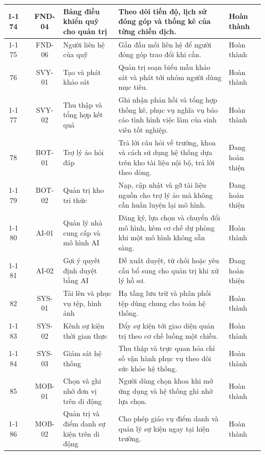 \documentclass[12pt,a4paper,oneside]{report}
\begin{document}
\begin{landscape}
\begin{longtable}{|c|>{\raggedright\arraybackslash}p{3.1cm}|c|>{\raggedright\arraybackslash}p{4.6cm}|>{\raggedright\arraybackslash}p{8.4cm}|>{\raggedright\arraybackslash}p{2.4cm}|}
\cline{1-1}\cline{3-6}
74 &  & FND-04 & Bảng điều khiển quỹ cho quản trị & Theo dõi tiến độ, lịch sử đóng góp và thống kê của từng chiến dịch. & Hoàn thành \\
\cline{1-1}\cline{3-6}
75 & \multirow{-5}{2.4cm}{\textbf{Gây quỹ}} & FND-06 & Người liên hệ của quỹ & Gắn đầu mối liên hệ để người đóng góp trao đổi khi cần. & Hoàn thành \\
\hline
76 &  & SVY-01 & Tạo và phát khảo sát & Quản trị soạn biểu mẫu khảo sát và phát tới nhóm người dùng mục tiêu. & Hoàn thành \\
\cline{1-1}\cline{3-6}
77 & \multirow{-2}{2.4cm}{\textbf{Khảo sát}} & SVY-02 & Thu thập và tổng hợp kết quả & Ghi nhận phản hồi và tổng hợp thống kê, phục vụ nghĩa vụ báo cáo tình hình việc làm của sinh viên tốt nghiệp. & Hoàn thành \\
\hline
78 &  & BOT-01 & Trợ lý ảo hỏi đáp & Trả lời câu hỏi về trường, khoa và cách sử dụng hệ thống dựa trên kho tài liệu nội bộ, trả lời theo dòng. & Đang hoàn thiện \\
\cline{1-1}\cline{3-6}
79 &  & BOT-02 & Quản trị kho tri thức & Nạp, cập nhật và gỡ tài liệu nguồn cho trợ lý ảo mà không cần huấn luyện lại mô hình. & Đang hoàn thiện \\
\cline{1-1}\cline{3-6}
80 &  & AI-01 & Quản lý nhà cung cấp và mô hình AI & Đăng ký, lựa chọn và chuyển đổi mô hình, kèm cơ chế dự phòng khi một mô hình không sẵn sàng. & Hoàn thành \\
\cline{1-1}\cline{3-6}
81 & \multirow{-4}{2.4cm}{\textbf{Trợ lý ảo và AI}} & AI-02 & Gợi ý quyết định duyệt bằng AI & Đề xuất duyệt, từ chối hoặc yêu cầu bổ sung cho quản trị khi xử lý hồ sơ. & Đang hoàn thiện \\
\hline
82 &  & SYS-01 & Tải lên và phục vụ tệp, hình ảnh & Hạ tầng lưu trữ và phân phối tệp dùng chung cho toàn hệ thống. & Hoàn thành \\
\cline{1-1}\cline{3-6}
83 &  & SYS-02 & Kênh sự kiện thời gian thực & Đẩy sự kiện tới giao diện quản trị theo cơ chế luồng một chiều. & Hoàn thành \\
\cline{1-1}\cline{3-6}
84 & \multirow{-3}{2.4cm}{\textbf{Nền tảng dùng chung}} & SYS-03 & Giám sát hệ thống & Thu thập và trực quan hóa chỉ số vận hành phục vụ theo dõi sức khỏe hệ thống. & Hoàn thành \\
\hline
85 &  & MOB-01 & Chọn và ghi nhớ đơn vị trên di động & Người dùng chọn khoa khi mở ứng dụng và hệ thống ghi nhớ lựa chọn. & Hoàn thành \\
\cline{1-1}\cline{3-6}
86 & \multirow{-2}{2.4cm}{\textbf{Ứng dụng di động}} & MOB-02 & Quản trị và điểm danh sự kiện trên di động & Cho phép giáo vụ điểm danh và quản lý sự kiện ngay tại hiện trường. & Hoàn thành \\
\hline
\end{longtable}
\end{landscape}
\renewcommand{\arraystretch}{1}
\end{document}
